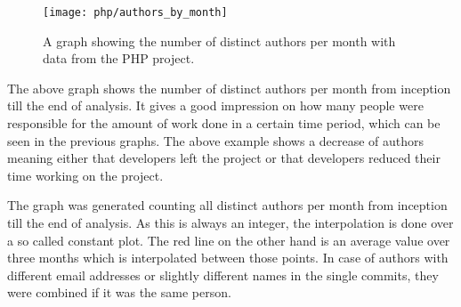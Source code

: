 \begin{figure}[h!t]
  \centering
  \texttt{[image: php/authors\_by\_month]}
  \caption{A graph showing the number of distinct authors per month with data
  from the PHP project.}
\end{figure}

The above graph shows the number of distinct authors per month from inception
till the end of analysis. It gives a good impression on how many people were
responsible for the amount of work done in a certain time period, which can be
seen in the previous graphs. The above example shows a decrease of authors
meaning either that developers left the project or that developers reduced
their time working on the project.

The graph was generated counting all distinct authors per month from inception
till the end of analysis. As this is always an integer, the interpolation is
done over a so called constant plot. The red line on the other hand is an
average value over three months which is interpolated between those points. In
case of authors with different email addresses or slightly different names in
the single commits, they were combined if it was the same person.



